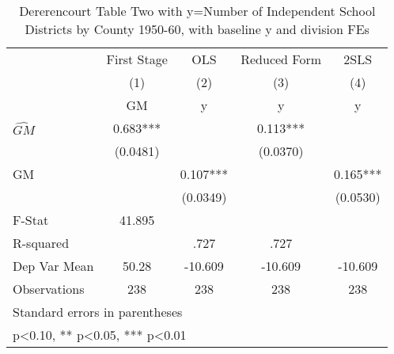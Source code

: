\begin{table}[htbp]\centering
\def\sym#1{\ifmmode^{#1}\else\(^{#1}\)\fi}
\caption{Dererencourt Table Two with y=Number of Independent School Districts by County 1950-60, with baseline y and division FEs}
\begin{tabular}{l*{4}{c}}
\toprule
                    & First Stage   &         OLS   &Reduced Form   &        2SLS   \\
                    &\multicolumn{1}{c}{(1)}&\multicolumn{1}{c}{(2)}&\multicolumn{1}{c}{(3)}&\multicolumn{1}{c}{(4)}\\
                    &\multicolumn{1}{c}{GM}&\multicolumn{1}{c}{y}&\multicolumn{1}{c}{y}&\multicolumn{1}{c}{y}\\
\midrule
$\hat{GM}$          &       0.683***&               &       0.113***&               \\
                    &    (0.0481)   &               &    (0.0370)   &               \\
\addlinespace
GM                  &               &       0.107***&               &       0.165***\\
                    &               &    (0.0349)   &               &    (0.0530)   \\
\midrule
F-Stat              &      41.895   &               &               &               \\
R-squared           &               &        .727   &        .727   &               \\
Dep Var Mean        &       50.28   &     -10.609   &     -10.609   &     -10.609   \\
Observations        &         238   &         238   &         238   &         238   \\
\bottomrule
\multicolumn{5}{l}{\footnotesize Standard errors in parentheses}\\
\multicolumn{5}{l}{\footnotesize * p<0.10, ** p<0.05, *** p<0.01}\\
\end{tabular}
\end{table}

